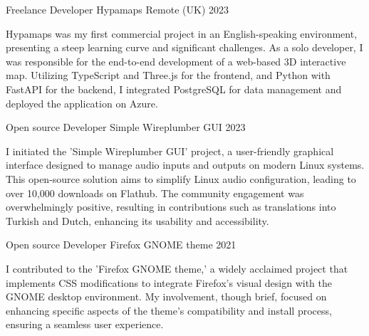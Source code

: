 \begin{cventries}

\cventry
{Freelance Developer} %
{Hypamaps} %
{Remote (UK)} %
{2023} %
{
  \begin{cvitems} %
    Hypamaps was my first commercial project in an English-speaking environment, presenting a steep learning curve and significant challenges.
    \newline
    As a solo developer, I was responsible for the end-to-end development of a web-based 3D interactive map.
    \newline
    Utilizing TypeScript and Three.js for the frontend, and Python with FastAPI for the backend, I integrated PostgreSQL for data management and deployed the application on Azure.
  \end{cvitems}
}


\cventry
{Open source Developer} %
{Simple Wireplumber GUI} %
{} %
{2023} %
{
  \begin{cvitems} %
    I initiated the 'Simple Wireplumber GUI' project, a user-friendly graphical interface designed to manage audio inputs and outputs on modern Linux systems.
    \newline
    This open-source solution aims to simplify Linux audio configuration, leading to over 10,000 downloads on Flathub.
    \newline
    The community engagement was overwhelmingly positive, resulting in contributions such as translations into Turkish and Dutch, enhancing its usability and accessibility. 
  \end{cvitems}
}

\cventry
{Open source Developer} %
{Firefox GNOME theme} %
{} %
{2021} %
{
  \begin{cvitems} %
    I contributed to the 'Firefox GNOME theme,' a widely acclaimed project that implements CSS modifications to integrate Firefox's visual design with the GNOME desktop environment.
    \newline
    My involvement, though brief, focused on enhancing specific aspects of the theme's compatibility and install process, ensuring a seamless user experience.
  \end{cvitems}
}

\end{cventries}


